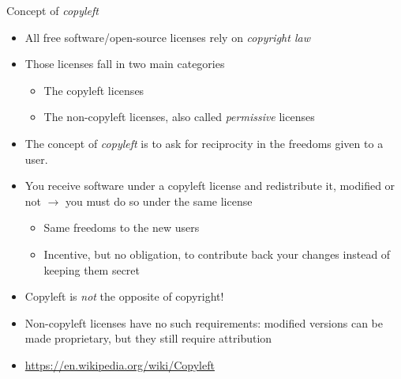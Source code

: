 \begin{frame}{Concept of {\em copyleft}}
  \begin{itemize}
  \item All free software/open-source licenses rely on {\em
      copyright law}
  \item Those licenses fall in two main categories
    \begin{itemize}
    \item The copyleft licenses
    \item The non-copyleft licenses, also called {\em permissive}
      licenses
    \end{itemize}
  \item The concept of {\em copyleft} is to ask for reciprocity in the
    freedoms given to a user.
  \item You receive software under a copyleft license and
    redistribute it, modified or not $\rightarrow$ you must do so
    under the same license
    \begin{itemize}
    \item Same freedoms to the new users
    \item Incentive, but no obligation, to contribute back your
      changes instead of keeping them secret
    \end{itemize}
  \item Copyleft is {\em not} the opposite of copyright!
  \item Non-copyleft licenses have no such requirements: modified
    versions can be made proprietary, but they still require
    attribution
  \item \url{https://en.wikipedia.org/wiki/Copyleft}
  \end{itemize}
\end{frame}

